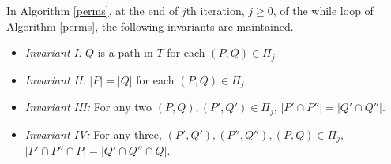 \documentclass[MS]             %
              {iitmdiss_as}    %
\begin{document}
\begin{lemma}
  \label{lem:invar1}
  In Algorithm \ref{perms}, at the end of $j$th iteration, $j \ge 0$,
  of the while loop of Algorithm \ref{perms}, the following invariants
  are maintained.
  \begin{itemize}
  \item {\em Invariant I:} $Q$ is a path in $T$ for each $(P,Q) \in
    \Pi_j$
  \item {\em Invariant II:} $|P|=|Q|$ for each $(P,Q) \in \Pi_j$
  \item {\em Invariant III:} For any two $(P,Q), (P',Q') \in \Pi_j$,
    $|P' \cap P''|=|Q' \cap Q''|$.
  \item {\em Invariant IV:} For any three, $(P',Q'), (P'',Q''), (P, Q)
    \in \Pi_j$, $|P' \cap P'' \cap P|=|Q' \cap Q'' \cap Q|$.
  \end{itemize}
\end{lemma}
\end{document}
